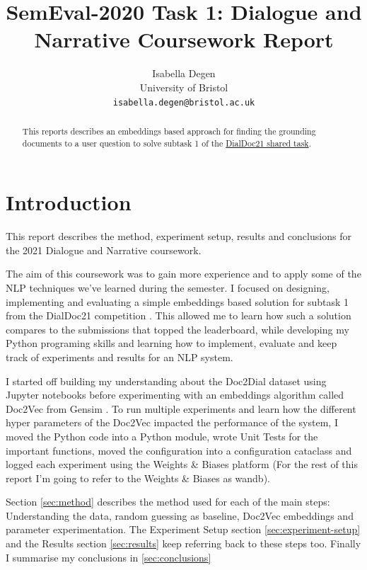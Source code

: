 \documentclass[11pt]{article}
\title{SemEval-2020 Task 1: Dialogue and Narrative Coursework Report}
\author{Isabella Degen \\ University of Bristol \\ {\tt isabella.degen@bristol.ac.uk}}
\date{}
\begin{document}
    \maketitle

    \begin{abstract}
        This reports describes an embeddings based approach for finding the
        grounding documents to a user question to solve subtask 1 of the
        \href{https://doc2dial.github.io/workshop2021/shared.html}{DialDoc21 shared task}.
    \end{abstract}


    \section{Introduction}\label{sec:introduction}
    This report describes the method, experiment setup, results and conclusions for the 2021 Dialogue and Narrative
    coursework.

    The aim of this coursework was to gain more experience and to apply some of the NLP techniques we've learned during
    the semester. I focused on designing, implementing and evaluating a simple embeddings based solution for
    subtask 1 from the DialDoc21
    competition \cite{feng-etal-2020-doc2dial}.
    This allowed me to learn how such a solution compares to the submissions that topped the leaderboard,
    while developing my Python programing skills and
    learning how to implement, evaluate and keep track of experiments and results for an NLP system.

    I started off building my understanding about the Doc2Dial dataset \cite{feng-etal-2020-doc2dial} using Jupyter notebooks
    before experimenting with an embeddings algorithm called Doc2Vec from Gensim \cite{doc2vec}.
    To run multiple experiments and learn how the different hyper parameters of the Doc2Vec impacted the performance of the
    system,
    I moved the Python code into a Python module, wrote Unit Tests for the important functions, moved the configuration
    into a configuration cataclass and logged each experiment using
    the Weights \& Biases platform \cite{wandb} (For the rest of this report I'm going to refer to the Weights \& Biases
    as wandb).

    Section \ref{sec:method}
    describes the method used for each of the main steps: Understanding the data, random guessing as baseline, Doc2Vec embeddings
    and parameter experimentation. The Experiment Setup section \ref{sec:experiment-setup} and the Results section \ref{sec:results}
    keep referring back to these steps too. Finally I summarise my conclusions in \ref{sec:conclusions}
\end{document}
